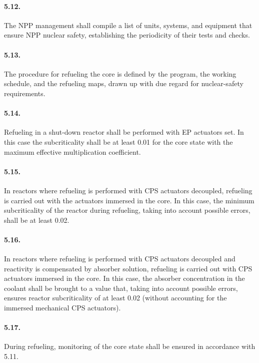 \documentclass[openright]{bookest}
\begin{document}
\paragraph{5.12.} The NPP management shall compile a list of units, systems, and equipment that ensure NPP nuclear safety, establishing the periodicity of their tests and checks.

\paragraph{5.13.} The procedure for refueling the core is defined by the program, the working schedule, and the refueling maps, drawn up with due regard for nuclear-safety requirements.

\paragraph{5.14.} Refueling in a shut-down reactor shall be performed with EP actuators set. In this case the subcriticality shall be at least 0.01 for the core state with the maximum effective multiplication coefficient.

\paragraph{5.15.} In reactors where refueling is performed with CPS actuators decoupled, refueling is carried out with the actuators immersed in the core. In this case, the minimum subcriticality of the reactor during refueling, taking into account possible errors, shall be at least 0.02.

\paragraph{5.16.} In reactors where refueling is performed with CPS actuators decoupled and reactivity is compensated by absorber solution, refueling is carried out with CPS actuators immersed in the core. In this case, the absorber concentration in the coolant shall be brought to a value that, taking into account possible errors, ensures reactor subcriticality of at least \num{0.02} (without accounting for the immersed mechanical CPS actuators).

\paragraph{5.17.} During refueling, monitoring of the core state shall be ensured in accordance with 5.11.
\end{document}
